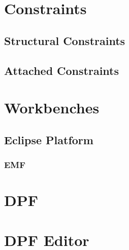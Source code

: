 \section{Constraints}

\subsection{Structural Constraints}

\subsection{Attached Constraints}

\section{Workbenches}

\subsection{Eclipse Platform}

\subsubsection{EMF}

\section{DPF}

\section{DPF Editor}
 

